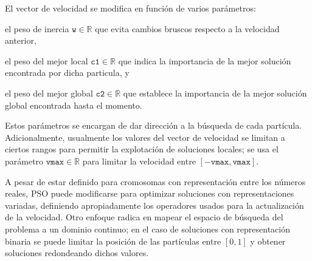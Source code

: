 El vector de velocidad se modifica en función de varios parámetros:
\begin{inparaenum}
\item el peso de inercia $\texttt{w} \in \mathbb{R}$ que evita cambios bruscos respecto a la velocidad anterior,
\item el peso del mejor local $\texttt{c1} \in \mathbb{R}$ que indica la importancia de la mejor solución encontrada por dicha particula, y
\item  el peso del mejor global $\texttt{c2} \in \mathbb{R}$ que establece la importancia de la mejor solución global encontrada hasta el momento.
\end{inparaenum}
Estos parámetros se encargan de dar dirección a la búsqueda de cada partícula. Adicionalmente, usualmente los valores del vector de velocidad se limitan a ciertos rangos para permitir la explotación de soluciones locales; se usa el parámetro $\texttt{vmax} \in \mathbb{R}$ para limitar la velocidad entre $[-\texttt{vmax},\texttt{vmax}]$.

A pesar de estar definido para cromosomas con representación entre los números reales, PSO puede modificarse para optimizar soluciones con representaciones variadas, definiendo apropiadamente los operadores usados para la actualización de la velocidad. Otro enfoque radica en mapear el espacio de búsqueda del problema a un dominio continuo; en el caso de soluciones con representación binaria se puede limitar la posición de las partículas entre $[0,1]$ y obtener soluciones redondeando dichos valores.
